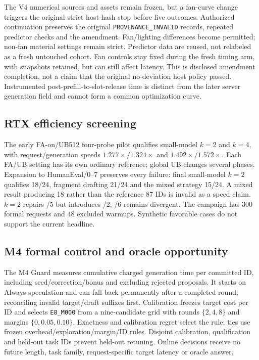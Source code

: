 The V4 numerical sources and assets remain frozen, but a fan-curve change triggers the original strict host-hash stop before live outcomes. Authorized continuation preserves the original \texttt{PROVENANCE\_INVALID} records, repeated predictor checks and the amendment. Fan/lighting differences become permitted; non-fan material settings remain strict. Predictor data are reused, not relabeled as a fresh untouched cohort. Fan controls stay fixed during the fresh timing arm, with snapshots retained, but can still affect latency. This is disclosed amendment completion, not a claim that the original no-deviation host policy passed. Instrumented post-prefill-to-slot-release time is distinct from the later server generation field and cannot form a common optimization curve.

\subsection{RTX efficiency screening}
\label{supp:rtx_efficiency_pilot}
The early FA-on/UB512 four-probe pilot qualifies small-model $k=2$ and $k=4$, with request/generation speeds $1.277\times/1.324\times$ and $1.492\times/1.572\times$. Each FA/UB setting has its own ordinary reference; global UB changes several phases. Expansion to HumanEval/0--7 preserves every failure: final small-model $k=2$ qualifies 18/24, fragment drafting 21/24 and the mixed strategy 15/24. A mixed result producing 18 rather than the reference 87 IDs is invalid as a speed claim. $k=2$ repairs /5 but introduces /2; /6 remains divergent. The campaign has 300 formal requests and 48 excluded warmups. Synthetic favorable cases do not support the current headline.

\subsection{M4 formal control and oracle opportunity}
\label{supp:m4_control}
The M4 Guard measures cumulative charged generation time per committed ID, including seed/correction/bonus and excluding rejected proposals. It starts on Always speculation and can fall back permanently after a completed round, reconciling invalid target/draft suffixes first. Calibration freezes target cost per ID and selects \texttt{E8\_M000} from a nine-candidate grid with rounds $\{2,4,8\}$ and margins $\{0,0.05,0.10\}$. Exactness and calibration regret select the rule; ties use frozen overhead/exploration/margin/ID rules. Disjoint calibration, qualification and held-out task IDs prevent held-out retuning. Online decisions receive no future length, task family, request-specific target latency or oracle answer.

